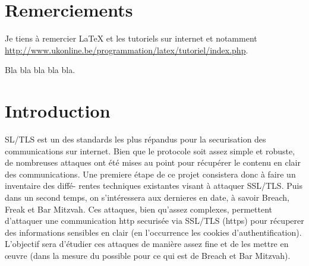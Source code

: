 \documentclass[a4paper,11pt,final]{article}
\begin{document}

\tableofcontents %
\sloppy          %
\cleardoublepage
 
%
\section*{Remerciements}

Je tiens à remercier \LaTeX{} et les tutoriels sur internet et notamment \url{http://www.ukonline.be/programmation/latex/tutoriel/index.php}.

Bla bla bla bla bla.

\cleardoublepage


%

\section*{Introduction} %

SL/TLS est un des standards les plus répandus pour la securisation des communications sur internet. Bien que le protocole soit assez simple et robuste, de nombreuses attaques ont été mises au point pour récupérer le contenu en clair des communications. Une premiere étape de ce projet consistera donc à faire un inventaire des diffé- rentes techniques existantes visant à attaquer SSL/TLS. Puis dans un second temps, on s’intéressera aux dernieres en date, à savoir Breach, Freak et Bar Mitzvah. Ces attaques, bien qu’assez complexes, permettent d’attaquer une communication http securisée via SSL/TLS (https) pour récuperer des informations sensibles en clair (en l’occurrence les cookies d’authentification). L’objectif sera d’étudier ces attaques de manière assez fine et de les mettre en œuvre (dans la mesure du possible pour ce qui est de Breach et Bar Mitzvah).
\end{document}
